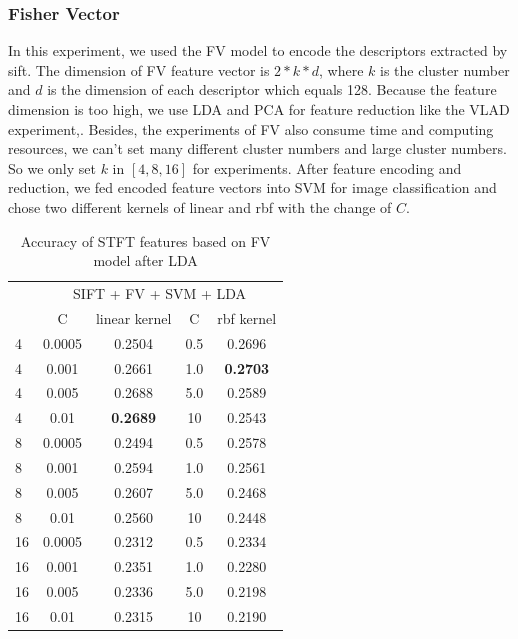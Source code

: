 \documentclass[conference]{IEEEtran}
\begin{document}
\subsubsection{Fisher Vector}
\label{sec:FV}
In this experiment, we used the FV model to encode the descriptors extracted by sift. The dimension of FV feature vector is $2*k*d$, where $k$ is the cluster number and $d$ is the dimension of each descriptor which equals 128. Because the feature dimension is too high, we use LDA and PCA for feature reduction like the VLAD experiment,. Besides, the experiments of FV also consume time and computing resources, we can't set many different cluster numbers and large cluster numbers. So we only set $k$ in $[4,8,16]$ for experiments. After feature encoding and reduction, we fed encoded feature vectors into SVM for image classification and chose two different kernels of linear and rbf with the change of $C$.

\begin{table}[htbp]
	\centering
	\newcommand{\tabincell}[2]{\begin{tabular}{@{}#1@{}}#2\end{tabular}}
	\renewcommand\arraystretch{1.0}
	\caption{Accuracy of STFT features based on FV model after LDA}
	\label{base4}%
	\begin{tabular}{@{}p{1cm}<{\centering}|c|c|c|c}
		\hline
		\multirow{2}{*}{\diagbox[height=2\line,width=1.42cm,font=\tiny]{$k$}{Acc.}{$\mathit{M}$}} &
		\multicolumn{4}{c}{SIFT + FV + SVM + LDA}\\
		\cline{2-5}
		& {C} & {linear kernel} & {C} & {rbf kernel}\\
		\hline
		4   & 0.0005  & 0.2504 & 0.5 & 0.2696\\
		4   & 0.001  & 0.2661 & 1.0 & \textbf{0.2703}\\
		4   & 0.005  & 0.2688 & 5.0 & 0.2589\\
		4   & 0.01  & \textbf{0.2689} & 10 & 0.2543\\
		8   & 0.0005 & 0.2494 & 0.5 & 0.2578\\
		8   & 0.001 & 0.2594 & 1.0 & 0.2561\\
		8   & 0.005 & 0.2607 & 5.0 & 0.2468\\
		8   & 0.01  & 0.2560 & 10 & 0.2448\\
		16   & 0.0005  & 0.2312 & 0.5 & 0.2334\\
		16   & 0.001  & 0.2351 & 1.0 & 0.2280\\
		16   & 0.005  & 0.2336 & 5.0 & 0.2198\\
		16   & 0.01  & 0.2315 & 10 & 0.2190\\
		\hline
	\end{tabular}
\end{table}
\end{document}
